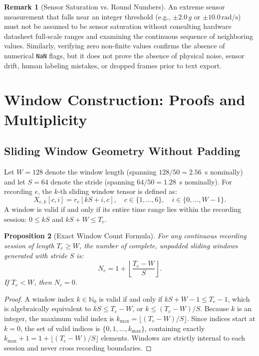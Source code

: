 \documentclass[11pt,a4paper]{article}
\newcommand{\code}[1]{{\small\ttfamily\nolinkurl{#1}}}
\newtheorem{proposition}{Proposition}[section]
\theoremstyle{definition}
\newtheorem{remark}[proposition]{Remark}
\begin{document}
\begin{remark}[Sensor Saturation vs. Round Numbers]
An extreme sensor measurement that falls near an integer threshold (e.g., $\pm 2.0\,g$ or $\pm 10.0\,\mathrm{rad/s}$) must not be assumed to be sensor saturation without consulting hardware datasheet full-scale ranges and examining the continuous sequence of neighboring values. Similarly, verifying zero non-finite values confirms the absence of numerical \code{NaN} flags, but it does not prove the absence of physical noise, sensor drift, human labeling mistakes, or dropped frames prior to text export.
\end{remark}

\section{Window Construction: Proofs and Multiplicity}

\subsection{Sliding Window Geometry Without Padding}
Let $W = 128$ denote the window length (spanning $128 / 50 = 2.56$~s nominally) and let $S = 64$ denote the stride (spanning $64 / 50 = 1.28$~s nominally). For recording $e$, the $k$-th sliding window tensor is defined as:
\begin{equation}
X_{e,k}[c, i] = r_e[kS + i, c], \quad c \in \{1, \ldots, 6\}, \quad i \in \{0, \ldots, W-1\}.
\end{equation}
A window is valid if and only if its entire time range lies within the recording session: $0 \le kS$ and $kS + W \le T_e$.

\begin{proposition}[Exact Window Count Formula]\label{prop:window_count}
For any continuous recording session of length $T_e \ge W$, the number of complete, unpadded sliding windows generated with stride $S$ is:
\begin{equation}\label{eq:window_count}
N_e = 1 + \left\lfloor \frac{T_e - W}{S} \right\rfloor.
\end{equation}
If $T_e < W$, then $N_e = 0$.
\end{proposition}
\begin{proof}
A window index $k \in \mathbb{N}_0$ is valid if and only if $kS + W - 1 \le T_e - 1$, which is algebraically equivalent to $kS \le T_e - W$, or $k \le (T_e - W)/S$. Because $k$ is an integer, the maximum valid index is $k_{\max} = \lfloor (T_e - W)/S \rfloor$. Since indices start at $k=0$, the set of valid indices is $\{0, 1, \ldots, k_{\max}\}$, containing exactly $k_{\max} + 1 = 1 + \lfloor (T_e - W)/S \rfloor$ elements. Windows are strictly internal to each session and never cross recording boundaries.
\end{proof}
\end{document}
